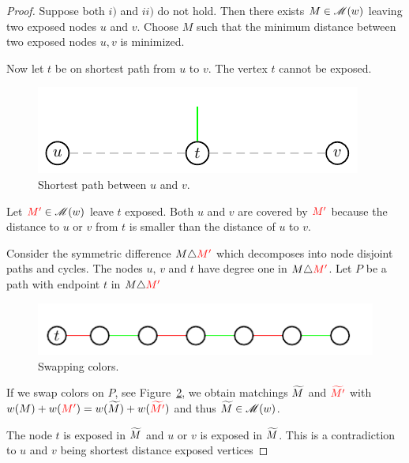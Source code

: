 \begin{proof}
Suppose both $i)$ and $ii)$ do not hold.
Then there exists ${ M}\in \mathscr{M}(w)$ leaving two exposed nodes $u$ and
$v$.  Choose $ M$ such that the  minimum  distance between   two exposed nodes
  $u,v$ is  minimized. 


Now let $t$ be on shortest path from $u$ to $v$. The vertex $t$ cannot
be exposed. 
\begin{figure}[htbp]
  \centering
    \begin{center}    
   \includegraphics{figures/IntProg5.pdf}
  \end{center}
  \caption{Shortest path between $u$ and $v$. }
  \label{po:fig:short}
\end{figure}


 Let ${\color{red} M'} \in \mathscr{M}(w)$ leave $t$ exposed. 
 Both $u$ and $v$ are covered by  ${\color{red} M'}$ because the distance to
 $u$ or $v$ from $t$ is smaller than the distance of $u$ to $v$. 
 
 Consider the symmetric difference ${ M} \triangle {\color{red} M'}$ which  decomposes into
 node disjoint paths and   cycles. 
The  nodes $u, \, v$ and $t$ have degree one in ${M}\triangle{\color{red} M'}$. Let 
$P$ be a  path with endpoint $t$ in ${ M}\triangle{\color{red} M'}$


\begin{figure}
  \centering
    
 \includegraphics{figures/IntProg6.pdf}
\caption{Swapping colors. }\label{po:fig:2}
\end{figure}




 If we swap colors on $P$, see Figure~\ref{po:fig:2}, we obtain matchings  ${\widetilde{M}}$ and
 $\color{red}{\widetilde{M'}}$ with 
 $w({ M}) + w({\color{red} M'}) = w({ \widetilde{M}})+w({ \color{red} \widetilde{M'}}) $ and thus
 ${ \widetilde{M}} \in \mathscr{M}(w)$.  

 The node $t$ is exposed in ${\widetilde{M}}$ and $u$ or $v$ is exposed  in
  ${\widetilde{M}}$. This is a  
contradiction to $u$ and $v$ being shortest distance exposed
  vertices 


\end{proof}



